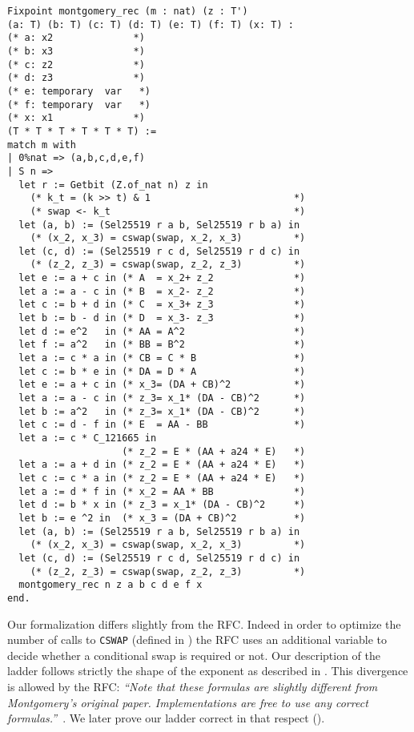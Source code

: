 \begin{lstlisting}[language=Coq]
Fixpoint montgomery_rec (m : nat) (z : T')
(a: T) (b: T) (c: T) (d: T) (e: T) (f: T) (x: T) :
(* a: x2              *)
(* b: x3              *)
(* c: z2              *)
(* d: z3              *)
(* e: temporary  var   *)
(* f: temporary  var   *)
(* x: x1              *)
(T * T * T * T * T * T) :=
match m with
| 0%nat => (a,b,c,d,e,f)
| S n =>
  let r := Getbit (Z.of_nat n) z in
    (* k_t = (k >> t) & 1                         *)
    (* swap <- k_t                                *)
  let (a, b) := (Sel25519 r a b, Sel25519 r b a) in
    (* (x_2, x_3) = cswap(swap, x_2, x_3)         *)
  let (c, d) := (Sel25519 r c d, Sel25519 r d c) in
    (* (z_2, z_3) = cswap(swap, z_2, z_3)         *)
  let e := a + c in (* A  = x_2+ z_2              *)
  let a := a - c in (* B  = x_2- z_2              *)
  let c := b + d in (* C  = x_3+ z_3              *)
  let b := b - d in (* D  = x_3- z_3              *)
  let d := e^2   in (* AA = A^2                   *)
  let f := a^2   in (* BB = B^2                   *)
  let a := c * a in (* CB = C * B                 *)
  let c := b * e in (* DA = D * A                 *)
  let e := a + c in (* x_3= (DA + CB)^2           *)
  let a := a - c in (* z_3= x_1* (DA - CB)^2      *)
  let b := a^2   in (* z_3= x_1* (DA - CB)^2      *)
  let c := d - f in (* E  = AA - BB               *)
  let a := c * C_121665 in
                    (* z_2 = E * (AA + a24 * E)   *)
  let a := a + d in (* z_2 = E * (AA + a24 * E)   *)
  let c := c * a in (* z_2 = E * (AA + a24 * E)   *)
  let a := d * f in (* x_2 = AA * BB              *)
  let d := b * x in (* z_3 = x_1* (DA - CB)^2     *)
  let b := e ^2 in  (* x_3 = (DA + CB)^2          *)
  let (a, b) := (Sel25519 r a b, Sel25519 r b a) in
    (* (x_2, x_3) = cswap(swap, x_2, x_3)         *)
  let (c, d) := (Sel25519 r c d, Sel25519 r d c) in
    (* (z_2, z_3) = cswap(swap, z_2, z_3)         *)
  montgomery_rec n z a b c d e f x
end.
\end{lstlisting}


Our formalization differs slightly from the RFC. Indeed in order to optimize the
number of calls to \texttt{CSWAP} (defined in )
the RFC uses an additional variable to decide
whether a conditional swap is required or not. Our description of the ladder
follows strictly the shape of the exponent as described in .
This divergence is allowed by the RFC:
\emph{``Note that these formulas are slightly different from Montgomery's
original paper. Implementations are free to use any correct formulas.''}~\cite{rfc7748}.
We later prove our ladder correct in that respect ().

